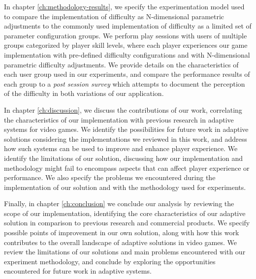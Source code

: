 In chapter \ref{ch:methodology-results}, we specify the experimentation model used to compare the implementation of difficulty as N-dimensional parametric adjustments to the commonly used implementation of difficulty as a limited set of parameter configuration groups. We perform play sessions with users of multiple groups categorized by player skill levels, where each player experiences our game implementation with pre-defined difficulty configurations and with N-dimensional parametric difficulty adjustments. We provide details on the characteristics of each user group used in our experiments, and compare the performance results of each group to a \emph{post session survey} which attempts to document the perception of the difficulty in both variations of our application.

In chapter \ref{ch:discussion}, we discuss the contributions of our work, correlating the characteristics of our implementation with previous research in adaptive systems for video games. We identify the possibilities for future work in adaptive solutions considering the implementations we reviewed in this work, and address how such systems can be used to improve and enhance player experience. We identify the limitations of our solution, discussing how our implementation and methodology might fail to encompass aspects that can affect player experience or performance. We also specify the problems we encountered during the implementation of our solution and with the methodology used for experiments.

Finally, in chapter \ref{ch:conclusion} we conclude our analysis by reviewing the scope of our implementation, identifying the core characteristics of our adaptive solution in comparison to previous research and commercial products. We specify possible points of improvement in our own solution, along with how this work contributes to the overall landscape of adaptive solutions in video games. We review the limitations of our solutions and main problems encountered with our experiment methodology, and conclude by exploring the opportunities encountered for future work in adaptive systems.
